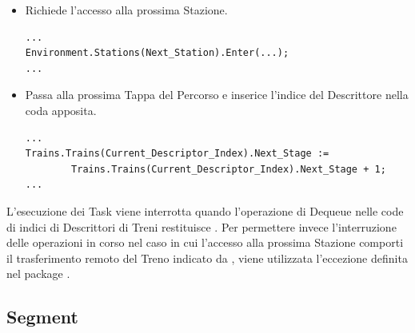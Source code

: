 \begin{itemize}
		\item Richiede l'accesso alla prossima Stazione.

\begin{lstlisting}
...
Environment.Stations(Next_Station).Enter(...);
...
\end{lstlisting}		

		\item Passa alla prossima Tappa del Percorso e inserice l'indice del Descrittore nella coda apposita.

\begin{lstlisting}
...
Trains.Trains(Current_Descriptor_Index).Next_Stage := 
		Trains.Trains(Current_Descriptor_Index).Next_Stage + 1;
...
\end{lstlisting}

	\end{itemize}
	
	L'esecuzione dei Task viene interrotta quando l'operazione di Dequeue nelle code di indici di Descrittori di Treni restituisce . Per permettere invece l'interruzione delle operazioni in corso nel caso in cui l'accesso alla prossima Stazione comporti il trasferimento remoto del Treno indicato da , viene utilizzata l'eccezione  definita nel package .
	
	
	\subsection{Segment}
	
